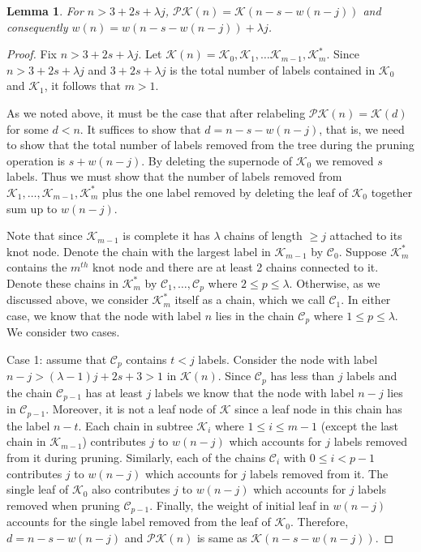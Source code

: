 \documentclass[12pt]{amsart}
\newtheorem{lemma}[theorem]{Lemma}
\numberwithin{equation}{section}
\numberwithin{theorem}{section}
\numberwithin{table}{section}
\numberwithin{figure}{section}
\begin{document}
\begin{lemma}
For $n > 3+2s+\lambda j$, ${\mathcal P} {\mathcal K}(n) = {\mathcal K}(n-s-w(n-j))$ and consequently $w(n) = w(n-s-w(n-j)) + \lambda j$.
\label{lemma:prun}
\end{lemma}
\begin{proof}
Fix $n > 3+2s+\lambda j$. Let ${\mathcal K}(n) ={\mathcal K}_0, {\mathcal K}_1, \ldots {\mathcal K}_{m-1}, {\mathcal K}^*_m$. Since $n> 3+2s+\lambda j$ and $3+2s+\lambda j$ is the total number of labels contained in ${\mathcal K}_0$ and ${\mathcal K}_1$, it follows that $m > 1$.

As we noted above, it must be the case that after relabeling ${\mathcal P} {\mathcal K}(n) = {\mathcal K}(d)$ for some $d<n$. It suffices to show that $d=n-s-w(n-j)$, that is, we need to show that the total number of labels removed from the tree during the pruning operation is $s+w(n-j)$. By deleting the supernode of ${\mathcal K}_0$ we removed $s$ labels. Thus we must show that the number of labels removed from ${\mathcal K}_1, \ldots, {\mathcal K}_{m-1}, {\mathcal K}^*_m$ plus the one label removed by deleting the leaf of ${\mathcal K}_0$ together sum up to $w(n-j)$.

Note that since ${\mathcal K}_{m-1}$ is complete it has $\lambda$ chains of length $\geq j$ attached to its knot node. Denote the chain with the largest label in ${\mathcal K}_{m-1}$ by ${\mathcal C}_0$. Suppose ${\mathcal K}^*_m$ contains the $m^{th}$ knot node and there are at least 2 chains connected to it. Denote these chains in ${\mathcal K}^*_m$ by ${\mathcal C}_1, \ldots, {\mathcal C}_p$ where $ 2 \leq p \leq \lambda$. Otherwise, as we discussed above, we consider ${\mathcal K}^*_m$ itself as a chain, which we call ${\mathcal C}_1$. In either case, we know that the node with label $n$ lies in the chain ${\mathcal C}_p$ where $1 \leq p \leq \lambda$. We consider two cases.

Case 1: assume that ${\mathcal C}_p$ contains $t<j$ labels. Consider the node with label $n-j>(\lambda-1)j+2s+3>1$ in ${\mathcal K}(n)$. Since ${\mathcal C}_p$ has less than $j$ labels and the chain ${\mathcal C}_{p-1}$ has at least $j$ labels we know that the node with label $n-j$ lies in ${\mathcal C}_{p-1}$. Moreover, it is not a leaf node of ${\mathcal K}$ since a leaf node in this chain has the label $n-t$. Each chain in subtree ${\mathcal K}_i$ where $1 \leq i \leq m-1$ (except the last chain in ${\mathcal K}_{m-1}$) contributes $j$ to $w(n-j)$ which accounts for $j$ labels removed from it during pruning. Similarly, each of the chains ${\mathcal C}_i$ with $0 \leq i < p - 1$ contributes $j$ to $w(n-j)$ which accounts for $j$ labels removed from it. The single leaf of ${\mathcal K}_0$ also contributes $j$ to $w(n-j)$ which accounts for $j$ labels removed when pruning ${\mathcal C}_{p-1}$. Finally, the weight of initial leaf in $w(n-j)$ accounts for the single label removed from the leaf of ${\mathcal K}_0$. Therefore, $d=n-s-w(n-j)$ and ${\mathcal P} {\mathcal K}(n)$ is same as ${\mathcal K}(n-s-w(n-j))$.


\end{proof}
\end{document}
